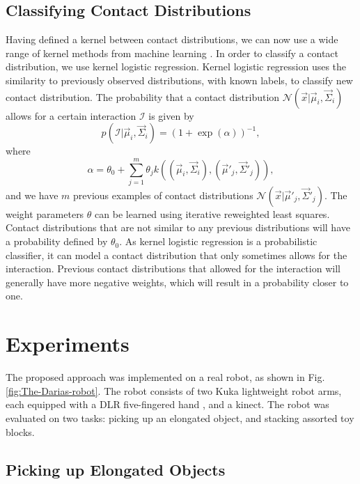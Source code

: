 \subsection{Classifying Contact Distributions\label{sub:Classifying-Contact-Distribution}}


Having defined a kernel between contact distributions, we can now
use a wide range of kernel methods from machine learning \cite{LearningWithKernels}.
In order to classify a contact distribution, we use kernel logistic
regression. Kernel logistic regression uses the similarity to previously
observed distributions, with known labels, to classify new contact
distribution. The probability that a contact distribution $\mathcal{N}(\vec{x}|\vec{\mu}_{i},\vec{\Sigma}_{i})$
allows for a certain interaction $\mathcal{I}$ is given by
\[
p(\mathcal{I}|\vec{\mu}_{i},\vec{\Sigma}_{i})=\left(1+\exp\left(\alpha\right)\right)^{-1},
\]
where
\[
\alpha=\theta_{0}+\sum_{j=1}^{m}\theta_{j}k((\vec{\mu}_{i},\vec{\Sigma}_{i}),(\vec{\mu}'_{j},\vec{\Sigma}'_{j})),
\]
and we have $m$ previous examples of contact distributions $\mathcal{N}(\vec{x}|\vec{\mu}'_{j},\vec{\Sigma}'_{j})$.
The weight parameters $\theta$ can be learned using iterative reweighted
least squares. Contact distributions that are not similar to any previous
distributions will have a probability defined by $\theta_{0}$. As
kernel logistic regression is a probabilistic classifier, it can model
a contact distribution that only sometimes allows for the interaction.
Previous contact distributions that allowed for the interaction will
generally have more negative weights, which will result in a probability
closer to one. 


\section{Experiments\label{sec:Experiments}}

The proposed approach was implemented on a real robot, as shown in
Fig. \ref{fig:The-Darias-robot}. The robot consists of two Kuka lightweight
robot arms, each equipped with a DLR five-fingered hand \cite{Zhaopeng},
and a kinect. The robot was evaluated on two tasks: picking up an
elongated object, and stacking assorted toy blocks. 


\subsection{Picking up Elongated Objects}

